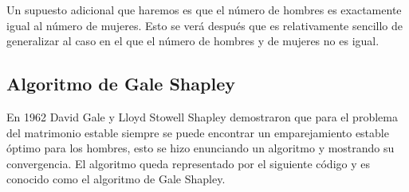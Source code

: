 Un supuesto adicional que haremos es que el número de hombres es exactamente igual al número de mujeres. Esto se verá después que es relativamente sencillo de generalizar al caso en el que el número de hombres y de mujeres no es igual. 

%


\subsection{Algoritmo de Gale Shapley}
En 1962 David Gale y Lloyd Stowell Shapley demostraron que para el problema del matrimonio estable siempre se puede encontrar un emparejamiento estable óptimo para los hombres, esto se hizo enunciando un algoritmo y mostrando su convergencia. El algoritmo queda representado por el siguiente código y es conocido como el algoritmo de Gale Shapley.


